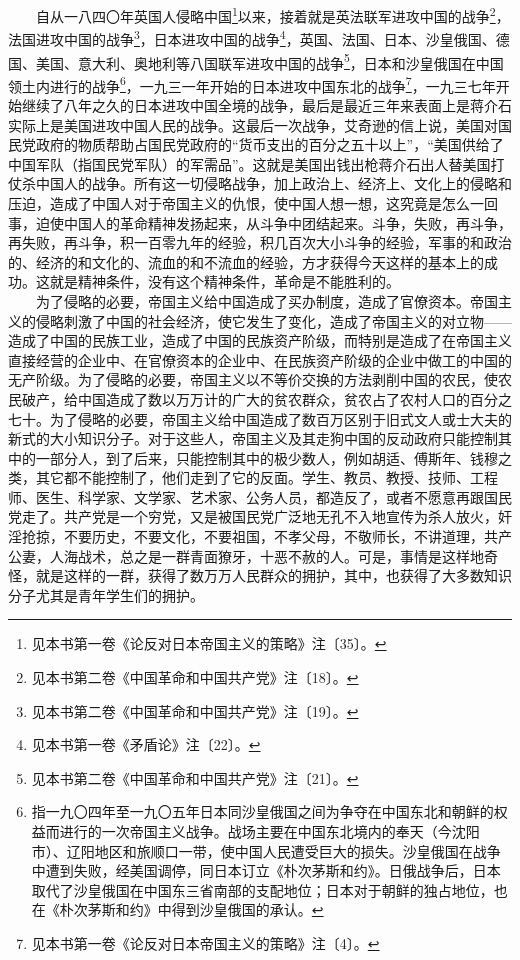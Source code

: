 \documentclass[cn,11pt,chinese]{elegantbook}
\begin{document}
　　自从一八四〇年英国人侵略中国\footnote[2]{ 见本书第一卷《论反对日本帝国主义的策略》注〔35〕。}以来，接着就是英法联军进攻中国的战争\footnote[3]{ 见本书第二卷《中国革命和中国共产党》注〔18〕。}，法国进攻中国的战争\footnote[4]{ 见本书第二卷《中国革命和中国共产党》注〔19〕。}，日本进攻中国的战争\footnote[5]{ 见本书第一卷《矛盾论》注〔22〕。}，英国、法国、日本、沙皇俄国、德国、美国、意大利、奥地利等八国联军进攻中国的战争\footnote[6]{ 见本书第二卷《中国革命和中国共产党》注〔21〕。}，日本和沙皇俄国在中国领土内进行的战争\footnote[7]{ 指一九〇四年至一九〇五年日本同沙皇俄国之间为争夺在中国东北和朝鲜的权益而进行的一次帝国主义战争。战场主要在中国东北境内的奉天（今沈阳市）、辽阳地区和旅顺口一带，使中国人民遭受巨大的损失。沙皇俄国在战争中遭到失败，经美国调停，同日本订立《朴次茅斯和约》。日俄战争后，日本取代了沙皇俄国在中国东三省南部的支配地位；日本对于朝鲜的独占地位，也在《朴次茅斯和约》中得到沙皇俄国的承认。}，一九三一年开始的日本进攻中国东北的战争\footnote[8]{ 见本书第一卷《论反对日本帝国主义的策略》注〔4〕。}，一九三七年开始继续了八年之久的日本进攻中国全境的战争，最后是最近三年来表面上是蒋介石实际上是美国进攻中国人民的战争。这最后一次战争，艾奇逊的信上说，美国对国民党政府的物质帮助占国民党政府的“货币支出的百分之五十以上”，“美国供给了中国军队（指国民党军队）的军需品”。这就是美国出钱出枪蒋介石出人替美国打仗杀中国人的战争。所有这一切侵略战争，加上政治上、经济上、文化上的侵略和压迫，造成了中国人对于帝国主义的仇恨，使中国人想一想，这究竟是怎么一回事，迫使中国人的革命精神发扬起来，从斗争中团结起来。斗争，失败，再斗争，再失败，再斗争，积一百零九年的经验，积几百次大小斗争的经验，军事的和政治的、经济的和文化的、流血的和不流血的经验，方才获得今天这样的基本上的成功。这就是精神条件，没有这个精神条件，革命是不能胜利的。\\
　　为了侵略的必要，帝国主义给中国造成了买办制度，造成了官僚资本。帝国主义的侵略刺激了中国的社会经济，使它发生了变化，造成了帝国主义的对立物——造成了中国的民族工业，造成了中国的民族资产阶级，而特别是造成了在帝国主义直接经营的企业中、在官僚资本的企业中、在民族资产阶级的企业中做工的中国的无产阶级。为了侵略的必要，帝国主义以不等价交换的方法剥削中国的农民，使农民破产，给中国造成了数以万万计的广大的贫农群众，贫农占了农村人口的百分之七十。为了侵略的必要，帝国主义给中国造成了数百万区别于旧式文人或士大夫的新式的大小知识分子。对于这些人，帝国主义及其走狗中国的反动政府只能控制其中的一部分人，到了后来，只能控制其中的极少数人，例如胡适、傅斯年、钱穆之类，其它都不能控制了，他们走到了它的反面。学生、教员、教授、技师、工程师、医生、科学家、文学家、艺术家、公务人员，都造反了，或者不愿意再跟国民党走了。共产党是一个穷党，又是被国民党广泛地无孔不入地宣传为杀人放火，奸淫抢掠，不要历史，不要文化，不要祖国，不孝父母，不敬师长，不讲道理，共产公妻，人海战术，总之是一群青面獠牙，十恶不赦的人。可是，事情是这样地奇怪，就是这样的一群，获得了数万万人民群众的拥护，其中，也获得了大多数知识分子尤其是青年学生们的拥护。\\
\end{document}
